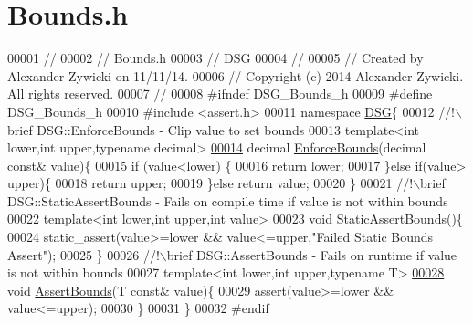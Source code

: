 \hypertarget{_bounds_8h_source}{\section{Bounds.\+h}
\label{_bounds_8h_source}
}

\begin{DoxyCode}
00001 \textcolor{comment}{//}
00002 \textcolor{comment}{//  Bounds.h}
00003 \textcolor{comment}{//  DSG}
00004 \textcolor{comment}{//}
00005 \textcolor{comment}{//  Created by Alexander Zywicki on 11/11/14.}
00006 \textcolor{comment}{//  Copyright (c) 2014 Alexander Zywicki. All rights reserved.}
00007 \textcolor{comment}{//}
00008 \textcolor{preprocessor}{#ifndef DSG\_Bounds\_h}
00009 \textcolor{preprocessor}{#define DSG\_Bounds\_h}
00010 \textcolor{preprocessor}{#include <assert.h>}
00011 \textcolor{keyword}{namespace }\hyperlink{namespace_d_s_g}{DSG}\{\textcolor{comment}{}
00012 \textcolor{comment}{    //!\(\backslash\)brief DSG::EnforceBounds - Clip value to set bounds}
00013 \textcolor{comment}{}    \textcolor{keyword}{template}<\textcolor{keywordtype}{int} lower,\textcolor{keywordtype}{int} upper,\textcolor{keyword}{typename} decimal>
\hypertarget{_bounds_8h_source_l00014}{}\hyperlink{namespace_d_s_g_a8bc6af8f213f4f713bd634ec8545491c}{00014}     decimal \hyperlink{namespace_d_s_g_a8bc6af8f213f4f713bd634ec8545491c}{EnforceBounds}(decimal \textcolor{keyword}{const}& value)\{
00015         \textcolor{keywordflow}{if} (value<lower) \{
00016             \textcolor{keywordflow}{return} lower;
00017         \}\textcolor{keywordflow}{else} \textcolor{keywordflow}{if}(value> upper)\{
00018             \textcolor{keywordflow}{return} upper;
00019         \}\textcolor{keywordflow}{else} \textcolor{keywordflow}{return} value;
00020     \}\textcolor{comment}{}
00021 \textcolor{comment}{    //!\(\backslash\)brief DSG::StaticAssertBounds - Fails on compile time if value is not within bounds}
00022 \textcolor{comment}{}    \textcolor{keyword}{template}<\textcolor{keywordtype}{int} lower,\textcolor{keywordtype}{int} upper,\textcolor{keywordtype}{int} value>
\hypertarget{_bounds_8h_source_l00023}{}\hyperlink{namespace_d_s_g_a3fa12557d889e704f2e33d88929ec67a}{00023}     \textcolor{keywordtype}{void} \hyperlink{namespace_d_s_g_a3fa12557d889e704f2e33d88929ec67a}{StaticAssertBounds}()\{
00024         static\_assert(value>=lower && value<=upper,\textcolor{stringliteral}{"Failed Static Bounds Assert"});
00025     \}\textcolor{comment}{}
00026 \textcolor{comment}{    //!\(\backslash\)brief DSG::AssertBounds - Fails on runtime if value is not within bounds}
00027 \textcolor{comment}{}    \textcolor{keyword}{template}<\textcolor{keywordtype}{int} lower,\textcolor{keywordtype}{int} upper,\textcolor{keyword}{typename} T>
\hypertarget{_bounds_8h_source_l00028}{}\hyperlink{namespace_d_s_g_a386b0133be9f4c7cb1ba014170ce294d}{00028}     \textcolor{keywordtype}{void} \hyperlink{namespace_d_s_g_a386b0133be9f4c7cb1ba014170ce294d}{AssertBounds}(T \textcolor{keyword}{const}& value)\{
00029         assert(value>=lower && value<=upper);
00030     \}
00031 \}
00032 \textcolor{preprocessor}{#endif}
\end{DoxyCode}
